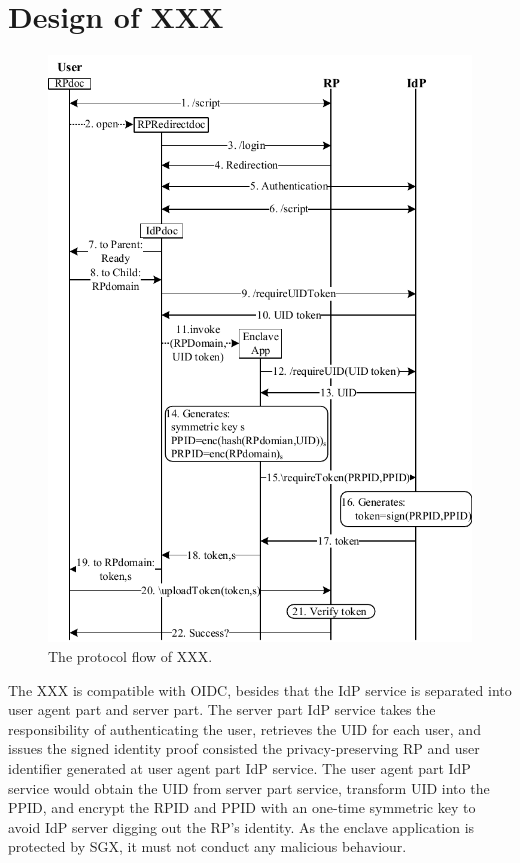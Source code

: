 \section{Design of XXX}
\begin{figure}
  \centering
  \includegraphics[width=\linewidth]{fig/sgx-sso.pdf}
  \caption{The protocol flow of XXX.}
  \label{fig:XXX}
\end{figure}
The XXX is compatible with OIDC, besides that the IdP service is separated into user agent part and server part. 
The server part IdP service takes the responsibility of authenticating the user, retrieves the UID for each user, and issues the signed identity proof consisted the privacy-preserving RP and user identifier generated at user agent part IdP service.
The user agent part IdP service would obtain the UID from server part service, transform UID into the PPID, and encrypt the RPID and PPID with an one-time symmetric key to avoid IdP server digging out the RP's identity. As the enclave application is protected by SGX, it must not conduct any malicious behaviour. 


